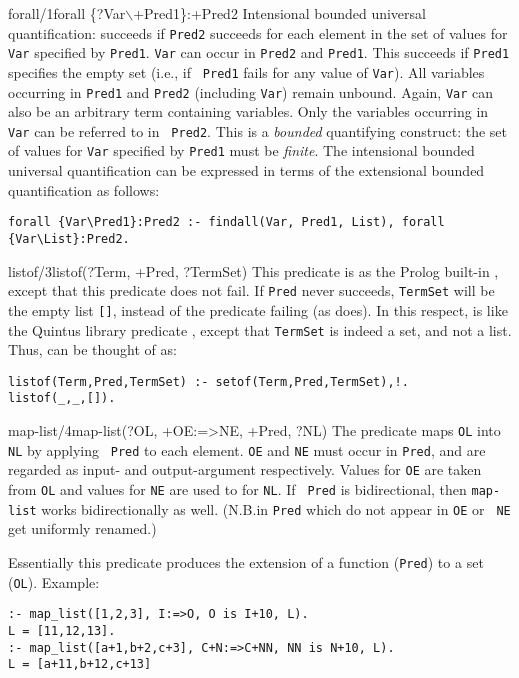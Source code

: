 \begin{predicate}{forall/1}{forall \{?Var$\backslash$+Pred1\}:+Pred2}%
Intensional bounded universal quantification: succeeds if {\tt Pred2}
succeeds for each element in the set of values for {\tt Var} specified
by {\tt Pred1}. {\tt Var} can occur in {\tt Pred2} and {\tt Pred1}.
This succeeds if {\tt Pred1} specifies the empty set (i.e., if {\tt
Pred1} fails for any value of {\tt Var}). All variables occurring in
{\tt Pred1} and {\tt Pred2} (including {\tt Var}) remain unbound.
Again, {\tt Var} can also be an arbitrary term containing variables.
Only the variables occurring in {\tt Var} can be referred to in {\tt
Pred2}. This is a {\em bounded\/} quantifying construct: the set of
values for {\tt Var} specified by {\tt Pred1} must be {\em finite}.
The intensional bounded universal quantification can be expressed in
terms of the extensional bounded quantification as follows:
\begin{verbatim}
forall {Var\Pred1}:Pred2 :- findall(Var, Pred1, List), forall
{Var\List}:Pred2.
\end{verbatim}
\end{predicate}

\begin{predicate}{listof/3}{listof(?Term, +Pred, ?TermSet)}%
This predicate is as the Prolog built-in , except that this
predicate does not fail. If {\tt Pred} never succeeds, {\tt TermSet}
will be the empty list {\tt []}, instead of the predicate failing (as
 does). In this respect,  is like the Quintus
library predicate , except that {\tt TermSet} is indeed a
set, and not a list. Thus,  can be thought of as:
\begin{verbatim}
listof(Term,Pred,TermSet) :- setof(Term,Pred,TermSet),!.
listof(_,_,[]).
\end{verbatim}
\end{predicate}

\begin{predicate}{map-list/4}{map-list(?OL, +OE:=>NE, +Pred, ?NL)}%
The predicate maps {\tt OL} into {\tt NL} by applying {\tt
Pred} to each element. {\tt OE} and {\tt NE} must occur in
{\tt Pred}, and are regarded as input- and output-argument
respectively.  Values for {\tt OE} are taken from {\tt OL}
and values for { \tt NE} are used to for {\tt NL}.  If {\tt
Pred} is bidirectional, then \verb|map-list| works bidirectionally as
well.  (N.B.\@Variables in {\tt Pred} which do not appear in {\tt OE} or {\tt
NE} get uniformly renamed.)


Essentially this predicate produces the extension of a function
({\tt Pred}) to a set ({\tt OL}).  Example:
\begin{verbatim}
:- map_list([1,2,3], I:=>O, O is I+10, L).
L = [11,12,13].
:- map_list([a+1,b+2,c+3], C+N:=>C+NN, NN is N+10, L).
L = [a+11,b+12,c+13]
\end{verbatim}
\end{predicate}


